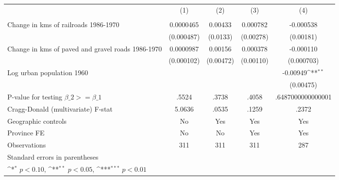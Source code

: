 {
\def\sym#1{\ifmmode^{#1}\else\(^{#1}\)\fi}
\begin{tabular}{l*{4}{c}}
\hline\hline
                &\multicolumn{1}{c}{(1)}&\multicolumn{1}{c}{(2)}&\multicolumn{1}{c}{(3)}&\multicolumn{1}{c}{(4)}\\
                &\multicolumn{1}{c}{}&\multicolumn{1}{c}{}&\multicolumn{1}{c}{}&\multicolumn{1}{c}{}\\
\hline
Change in kms of railroads 1986-1970&0.0000465         &  0.00433         & 0.000782         &-0.000538         \\
                &(0.000487)         & (0.0133)         &(0.00278)         &(0.00181)         \\
[1em]
Change in kms of paved and gravel roads 1986-1970&0.0000987         &  0.00156         & 0.000378         &-0.000110         \\
                &(0.000102)         &(0.00472)         &(0.00110)         &(0.000703)         \\
[1em]
Log urban population 1960&                  &                  &                  & -0.00949\sym{**} \\
                &                  &                  &                  &(0.00475)         \\
\hline
P-value for testing $\beta\_{2} >= \beta\_{1}$&    .5524         &    .3738         &    .4058         &.6487000000000001         \\
Cragg-Donald (multivariate) F-stat&   5.0636         &    .0535         &    .1259         &    .2372         \\
Geographic controls&       No         &      Yes         &      Yes         &      Yes         \\
Province FE     &       No         &       No         &      Yes         &      Yes         \\
Observations    &      311         &      311         &      311         &      287         \\
\hline\hline
\multicolumn{5}{l}{\footnotesize Standard errors in parentheses}\\
\multicolumn{5}{l}{\footnotesize \sym{*} \(p<0.10\), \sym{**} \(p<0.05\), \sym{***} \(p<0.01\)}\\
\end{tabular}
}
